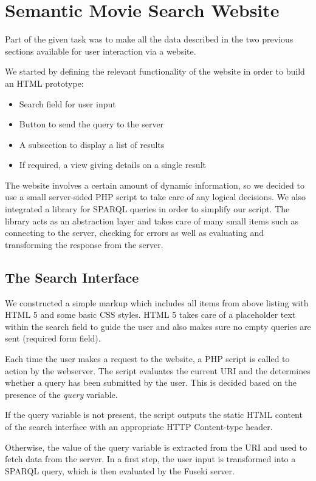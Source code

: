 \section{Semantic Movie Search Website}
Part of the given task was to make all the data described in the two previous sections available for user interaction via a website.

We started by defining the relevant functionality of the website in order to build an HTML prototype:

\begin{itemize}
\item Search field for user input
\item Button to send the query to the server
\item A subsection to display a list of results
\item If required, a view giving details on a single result
\end{itemize}

The website involves a certain amount of dynamic information, so we decided to use a small server-sided PHP script to take care of any logical decisions. We also integrated a library for SPARQL queries in order to simplify our script. The library acts as an abstraction layer and takes care of many small items such as connecting to the server, checking for errors as well as evaluating and transforming the response from the server. \cite{sparqllib}

\subsection{The Search Interface}
We constructed a simple markup which includes all items from above listing with HTML 5 and some basic CSS styles. HTML 5 takes care of a placeholder text within the search field to guide the user and also makes sure no empty queries are sent (required form field).

Each time the user makes a request to the website, a PHP script is called to action by the webserver. The script evaluates the current URI and the determines whether a query has been submitted by the user. This is decided based on the presence of the \emph{query} variable.

If the query variable is not present, the script outputs the static HTML content of the search interface with an appropriate HTTP Content-type header.

Otherwise, the value of the query variable is extracted from the URI and used to fetch data from the server. In a first step, the user input is transformed into a SPARQL query, which is then evaluated by the Fuseki server.


